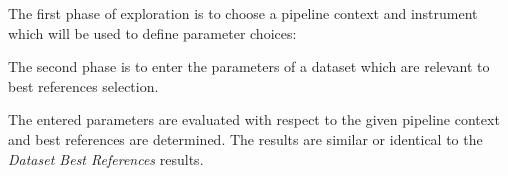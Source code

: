 \documentclass[letterpaper,10pt,english]{sphinxmanual}
\begin{document}
The first phase of exploration is to choose a pipeline context and instrument
which will be used to define parameter choices:
\begin{figure}[htbp]
\centering

\end{figure}

The second phase is to enter the parameters of a dataset which are relevant
to best references selection.
\begin{figure}[htbp]
\centering

\end{figure}

The entered parameters are evaluated with respect to the given pipeline context
and best references are determined.   The results are similar or identical to
the \emph{Dataset Best References} results.
\end{document}
